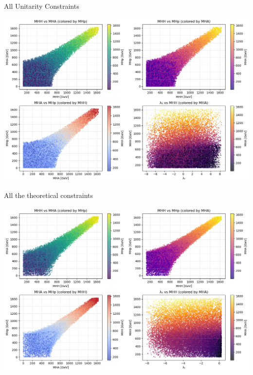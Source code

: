 \documentclass{../bredelebeamer}
\begin{document}
\begin{frame}{All Unitarity Constraints}
    \begin{center}
        \includegraphics[width=\textwidth]{unitarity_satisfied_THDM_param_scan_analysis}
    \end{center}
\end{frame}

\begin{frame}{All the theoretical constraints}
    \begin{center}
        \includegraphics[width=\textwidth]{Theoretical_constraints_satisfied_THDM_param_scan_analysis}
    \end{center}
\end{frame}
\end{document}
